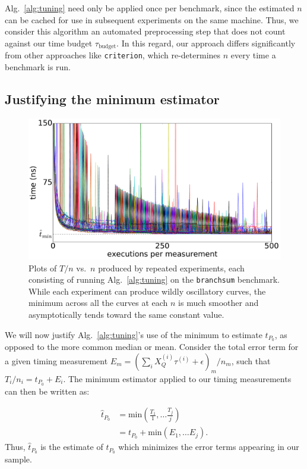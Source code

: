 \documentclass[conference]{IEEEtran}
\begin{document}
Alg.~\ref{alg:tuning} need only be applied once per benchmark, since the
estimated $n$ can be cached for use in subsequent experiments on the same
machine. Thus, we consider this algorithm an automated preprocessing step that
does not count against our time budget $\tau_{\textrm{budget}}$. In this
regard, our approach differs significantly from other approaches like
\lstinline|criterion|, which re-determines $n$ every time a benchmark is run.

\subsection{Justifying the minimum estimator}
\label{sec:minimum}

\begin{figure}
\centering
\includegraphics[width=\columnwidth]{figures/fig2/linear_scan_branchsum}
\caption{Plots of $T/n$ vs.\ $n$ produced by repeated experiments, each
consisting of running Alg.~\ref{alg:tuning} on the \lstinline|branchsum|
benchmark. While each experiment can produce wildly oscillatory curves, the
minimum across all the curves at each $n$ is much smoother and asymptotically
tends toward the same constant value.}
\label{fig:scaling}
\end{figure}

We will now justify Alg.~\ref{alg:tuning}'s use of the minimum to estimate $t_{P_0}$, as
opposed to the more common median or mean.
Consider the total error term for a given timing measurement $E_m = \left(\sum_{i}
X_Q^{(i)} \tau^{(i)} + \epsilon \right)_m / n_m$, such that $T_i/n_i = t_{P_0} +
E_i$. The minimum estimator applied to our timing measurements can then be
written as:

\begin{align}
    \hat{t}_{P_0} &= \textrm{min}(\frac{T_1}{1}, \dots \frac{T_j}{j}) \nonumber \\
                  &= t_{P_0} + \textrm{min}(E_1, \dots E_j).
\end{align}
%
Thus, $\hat{t}_{P_0}$ is the estimate of $t_{P_0}$ which minimizes the error terms appearing
in our sample.
\end{document}

